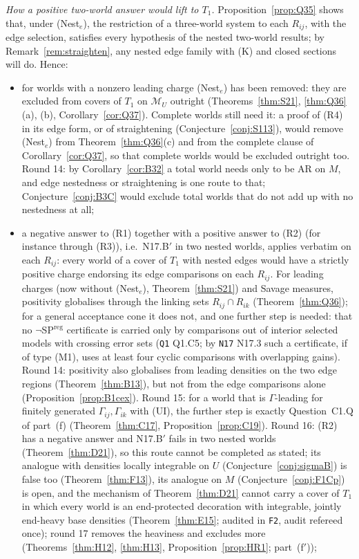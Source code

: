 \documentclass[11pt]{article}
\theoremstyle{definition}
\theoremstyle{remark}
\newcommand{\M}{\mathcal M}
\newcommand{\src}[1]{\texttt{#1}}
\begin{document}
\emph{How a positive two-world answer would lift to $T_1$.} Proposition~\ref{prop:Q35} shows that, under (Nest$_e$), the restriction of a three-world system to each $R_{ij}$, with the edge selection, satisfies every hypothesis of the nested two-world results; by Remark~\ref{rem:straighten}, any nested edge family with (K) and closed sections will do. Hence:
\begin{itemize}[leftmargin=*]
\item for worlds with a nonzero leading charge (Nest$_e$) has been removed: they are excluded from covers of $T_1$ on $\M_U$ outright (Theorems~\ref{thm:S21}, \ref{thm:Q36}(a), (b), Corollary~\ref{cor:Q37}). Complete worlds still need it: a proof of (R4) in its edge form, or of straightening (Conjecture~\ref{conj:S113}), would remove (Nest$_e$) from Theorem~\ref{thm:Q36}(c) and from the complete clause of Corollary~\ref{cor:Q37}, so that complete worlds would be excluded outright too. Round 14: by Corollary~\ref{cor:B32} a total world needs only to be AR on $M$, and edge nestedness or straightening is one route to that; Conjecture~\ref{conj:B3C} would exclude total worlds that do not add up with no nestedness at all;
\item a negative answer to (R1) together with a positive answer to (R2) (for instance through (R3)), i.e.\ N17.B$'$ in two nested worlds, applies verbatim on each $R_{ij}$: every world of a cover of $T_1$ with nested edges would have a strictly positive charge endorsing its edge comparisons on each $R_{ij}$. For leading charges (now without (Nest$_e$), Theorem~\ref{thm:S21}) and Savage measures, positivity globalises through the linking sets $R_{ij}\cap R_{ik}$ (Theorem~\ref{thm:Q36}); for a general acceptance cone it does not, and one further step is needed: that no $\neg$SP$^{\mathrm{reg}}$ certificate is carried only by comparisons out of interior selected models with crossing error sets (\src{Q1} Q1.C5; by \src{N17} N17.3 such a certificate, if of type (M1), uses at least four cyclic comparisons with overlapping gains). Round 14: positivity also globalises from leading densities on the two edge regions (Theorem~\ref{thm:B13}), but not from the edge comparisons alone (Proposition~\ref{prop:B1cex}). Round 15: for a world that is $\Gamma$-leading for finitely generated $\Gamma_{ij},\Gamma_{ik}$ with (UI), the further step is exactly Question~C1.Q of part~(f) (Theorem~\ref{thm:C17}, Proposition~\ref{prop:C19}). Round 16: (R2) has a negative answer and N17.B$'$ fails in two nested worlds (Theorem~\ref{thm:D21}), so this route cannot be completed as stated; its analogue with densities locally integrable on $U$ (Conjecture~\ref{conj:sigmaB}) is false too (Theorem~\ref{thm:F13}), its analogue on $M$ (Conjecture~\ref{conj:F1Cp}) is open, and the mechanism of Theorem~\ref{thm:D21} cannot carry a cover of $T_1$ in which every world is an end-protected decoration with integrable, jointly end-heavy base densities (Theorem~\ref{thm:E15}; audited in \src{F2}, audit refereed once); round 17 removes the heaviness and excludes more (Theorems~\ref{thm:H12}, \ref{thm:H13}, Proposition~\ref{prop:HR1}; part~(f$'$));

\end{itemize}
\end{document}

